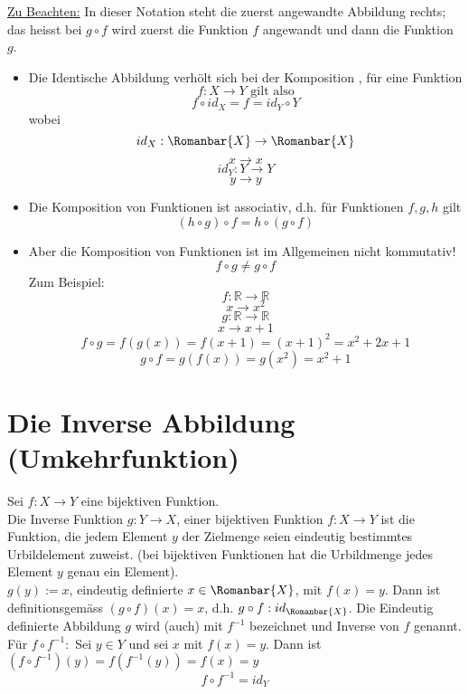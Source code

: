 \underline{Zu Beachten:}
In dieser Notation steht die zuerst angewandte Abbildung rechts; das heisst bei $g\circ f$ wird zuerst die Funktion $f$ angewandt und dann die Funktion $g$. 
\begin{itemize}
\item Die Identische Abbildung verhölt sich bei der Komposition , für eine Funktion \[f:X\rightarrow Y \text{ gilt also}\]
\[f\circ id_X=f=id_Y \circ Y\] wobei \[id_X:\Romanbar{X}\rightarrow\Romanbar{X}\]\[x\rightarrow x\] \[id_Y :Y\rightarrow Y\]\[y\rightarrow y\]

\item Die Komposition von Funktionen ist associativ, d.h. für Funktionen $f,g,h$ gilt \[\left( h\circ g\right)\circ f=h\circ \left( g\circ f\right)\]
\item Aber die Komposition von Funktionen ist im Allgemeinen nicht kommutativ! \[f\circ g\not= g\circ f\]
Zum Beispiel:
\[f:\mathbb{R}\rightarrow\mathbb{R}\]\[x\rightarrow x^2\]\[g:\mathbb{R}\rightarrow\mathbb{R}\]\[x\rightarrow x+1\]
\[f\circ g=f\left( g(x)\right)=f(x+1)=(x+1)^2=x^2+2x+1\]\[g\circ f=g\left( f(x)\right)=g(x^2)=x^2+1\]
\end{itemize}

\section{Die Inverse Abbildung (Umkehrfunktion)}
Sei $f:X\rightarrow Y$ eine bijektiven Funktion. \\

Die Inverse Funktion $g:Y\rightarrow X$, einer bijektiven Funktion $f:X\rightarrow Y$ ist die Funktion, die jedem Element $y$ der Zielmenge seien eindeutig bestimmtes Urbildelement zuweist. (bei bijektiven Funktionen hat die Urbildmenge jedes Element $y$ genau ein Element). \\

 $g(y):=x$, eindeutig definierte $ x\in\Romanbar{X}$, mit $f(x)=y$. Dann ist definitionsgemäss $(g\circ f)(x)=x$, d.h. $g\circ f:id_{\Romanbar{X}}$. Die Eindeutig definierte Abbildung $g$ wird (auch) mit $f^{-1}$ bezeichnet und Inverse von $f$ genannt.\\

Für $f\circ f^{-1}:$ Sei $y\in Y$ und sei $x$ mit $f(x)=y$. Dann ist $\left( f\circ f^{-1}\right)(y)=f\left(f^{-1}(y)\right)=f(x)=y$ \[f\circ f^{-1}=id_Y\]

